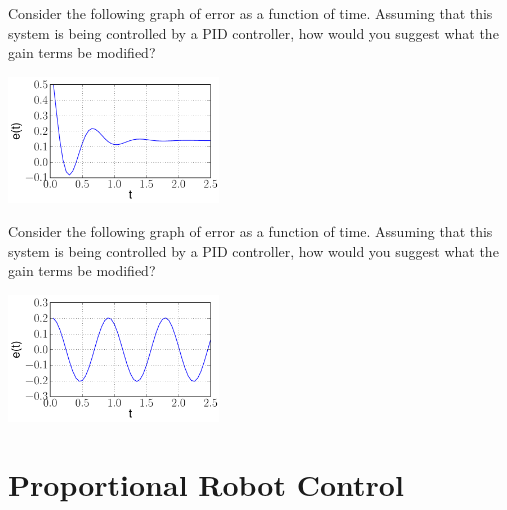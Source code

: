 \begin{exercise}
  Consider the following graph of error as a function of
  time. Assuming that this system is being controlled by a PID
  controller, how would you suggest what the gain terms be modified?
  \begin{center}
  \includegraphics[width=2.2in]{pid/figs/pid_stop_and_think1.pdf}
  \end{center}
\end{exercise}

\begin{exercise}
  Consider the following graph of error as a function of
  time. Assuming that this system is being controlled by a PID
  controller, how would you suggest what the gain terms be modified?
  \begin{center}
  \includegraphics[width=2.2in]{pid/figs/pid_stop_and_think2.pdf}
  \end{center}
\end{exercise}




\section{Proportional Robot Control}
\label{sec:p_robot_control}
\newcommand{\drawwheel}[2]{
\begin{scope}[shift={(#1,#2)}]
\filldraw (.3,.1) -- (.3,-.1) -- (-.3,-.1) -- (-.3,.1) -- cycle; 
\end{scope}
}


